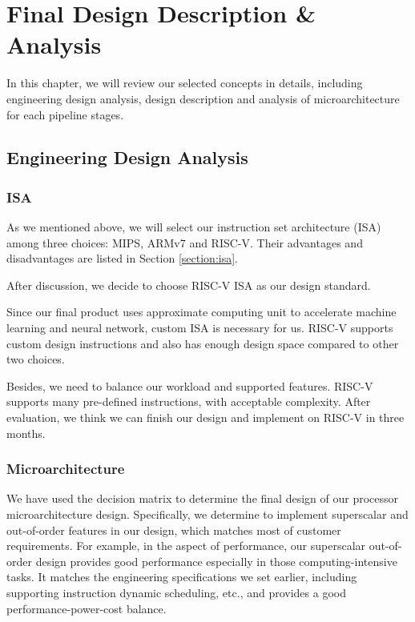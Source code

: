 
\let\clearpage\relax
\chapter{Final Design Description \& Analysis}

In this chapter, we will review our selected concepts in details, including engineering design analysis, design description and analysis of microarchitecture for each pipeline stages.

\section{Engineering Design Analysis}

\subsection{ISA} %
As we mentioned above, we will select our instruction set architecture (ISA) among three choices: MIPS, ARMv7 and RISC-V. Their advantages and disadvantages are listed in Section \ref{section:isa}.

After discussion, we decide to choose RISC-V ISA as our design standard.

Since our final product uses approximate computing unit to accelerate machine learning and neural network, custom ISA is necessary for us. RISC-V supports custom design instructions and also has enough design space compared to other two choices.

Besides, we need to balance our workload and supported features. RISC-V supports many pre-defined instructions, with acceptable complexity. After evaluation, we think we can finish our design and implement on RISC-V in three months.

\subsection{Microarchitecture} \label{section：Microarchitecture}%
We have used the decision matrix to determine the final design of our processor microarchitecture design. Specifically, we determine to implement superscalar and out-of-order features in our design, which matches most of customer requirements. For example, in the aspect of performance, our superscalar out-of-order design provides good performance especially in those computing-intensive tasks. It matches the engineering specifications we set earlier, including supporting instruction dynamic scheduling, etc., and provides a good performance-power-cost balance.


